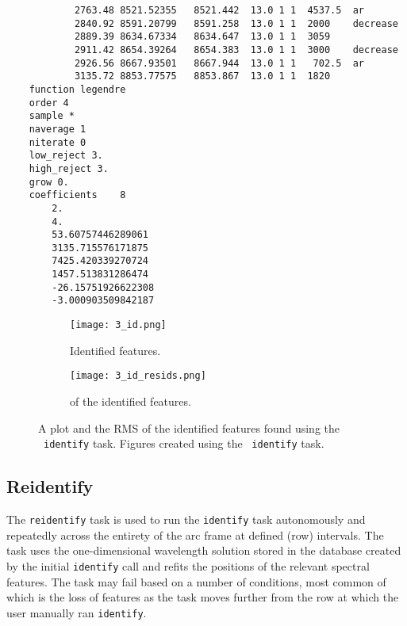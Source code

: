 \begin{lstlisting}
            2763.48 8521.52355   8521.442  13.0 1 1  4537.5  ar
            2840.92 8591.20799   8591.258  13.0 1 1  2000    decrease
            2889.39 8634.67334   8634.647  13.0 1 1  3059
            2911.42 8654.39264   8654.383  13.0 1 1  3000    decrease
            2926.56 8667.93501   8667.944  13.0 1 1   702.5  ar
            3135.72 8853.77575   8853.867  13.0 1 1  1820
    function legendre
    order 4
    sample *
    naverage 1
    niterate 0
    low_reject 3.
    high_reject 3.
    grow 0.
    coefficients	8
        2.
        4.
        53.60757446289061
        3135.715576171875
        7425.420339270724
        1457.513831286474
        -26.15751926622308
        -3.000903509842187

\end{lstlisting}

\begin{figure}
    \centering
    \begin{subfigure}[b]{0.49\textwidth}
        \centering
        \texttt{[image: 3\_id.png]}
        \caption{Identified features.}
    \end{subfigure}
    \hfill
    \begin{subfigure}[b]{0.49\textwidth}
        \centering
        \texttt{[image: 3\_id\_resids.png]}
        \caption{ of the identified features.}
    \end{subfigure}
    \caption{
        A plot and the \gls{RMS} of the identified features found using the \iraf\ \texttt{identify} task.
        Figures created using the \iraf\ \texttt{identify} task.
    }
    \label{fig:iraf_id_plot}
\end{figure}

\subsection{Reidentify} \label{subsec:iraf_reidentify}

The \texttt{reidentify} task is used to run the \texttt{identify} task autonomously and repeatedly across the entirety of the arc frame at defined (row) intervals.
The task uses the one-dimensional wavelength solution stored in the database created by the initial \texttt{identify} call and refits the positions of the relevant spectral features.
The task may fail based on a number of conditions, most common of which is the loss of features as the task moves further from the row at which the user manually ran \texttt{identify}.

